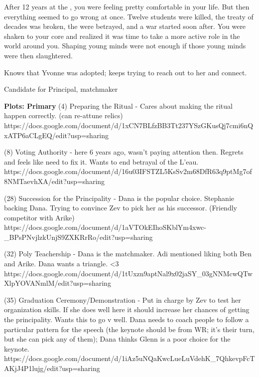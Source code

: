 \documentclass[char]{GL2020}
\begin{document}
After 12 years at the \pSchool{}, you were feeling pretty comfortable in your life. But then everything seemed to go wrong at once. Twelve students were killed, the treaty of decades was broken, the \pLeau{} were betrayed, and a war started soon after. You were shaken to your core and realized it was time to take a more active role in the world around you.	Shaping young minds were not enough if those young minds were then slaughtered. 

Knows that Yvonne was adopted; keeps trying to reach out to her and connect.



Candidate for Principal, matchmaker

\textbf{Plots: Primary}
(4) Preparing the Ritual - Cares about making the ritual happen correctly. (can re-attune relics)
https://docs.google.com/document/d/1xCN7BLfzBB3Tt237YSzGKusQj7cmi6nQxATP6aCLgEQ/edit?usp=sharing

(8) Voting Authority - here 6 years ago, wasn't paying attention then. Regrets and feels like need to fix it.
Wants to end betrayal of the L'eau.
https://docs.google.com/document/d/16u03IFSTZL5KsSv2m68DfR63q9ptMg7of8NMTaevhXA/edit?usp=sharing

(28) Succession for the Principality - Dana is the popular choice. Stephanie backing Dana. Trying to convince Zev to pick her as his successor. (Friendly competitor with Arike)
https://docs.google.com/document/d/1aVTOkEIhoSKblYm4xwc-_BPsPNvjlzkUnjS9ZXKRrRo/edit?usp=sharing

(32) Poly Teachership - Dana is the matchmaker. Adi mentioned liking both Ben and Arike. Dana wants a triangle. <3
https://docs.google.com/document/d/1tUxzn9aptNal9x02jaSY_03gNNMcwQTwXlpYOVANmlM/edit?usp=sharing

(35) Graduation Ceremony/Demonstration - Put in charge by Zev to test her organization skills. If she does well here it should increase her chances of getting the principality. Wants this to go v well. Dana needs to coach people to follow a particular pattern for the speech (the keynote should be from WR; it's their turn, but she can pick any of them); Dana thinks Glenn is a poor choice for the keynote.
https://docs.google.com/document/d/1iAz5uNQaKwcLueLuVdehK_7QhkevpFcTAKjJ4P1lujg/edit?usp=sharing
\end{document}
